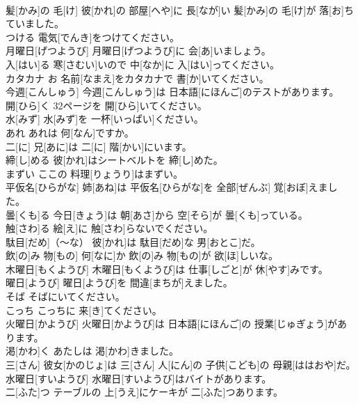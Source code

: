 \documentclass[8pt]{extreport}
\begin{document}
\begin{CJK}{UTF8}{min}
\\	髪[かみ]の 毛[け]	彼[かれ]の 部屋[へや]に 長[なが]い 髪[かみ]の 毛[け]が 落[お]ちていました。		
\\	つける	電気[でんき]をつけてください。		
\\	月曜日[げつようび]	月曜日[げつようび]に 会[あ]いましょう。		
\\	入[はい]る	寒[さむい]いので 中[なか]に 入[はい]ってください。		
\\	カタカナ	お 名前[なまえ]をカタカナで 書[か]いてください。		
\\	今週[こんしゅう]	今週[こんしゅう]は 日本語[にほんご]のテストがあります。		
\\	開[ひら]く	32ページを 開[ひら]いてください。		
\\	水[みず]	水[みず]を 一杯[いっぱい]ください。		
\\	あれ	あれは 何[なん]ですか。		
\\	二[に]	兄[あに]は 二[に] 階[かい]にいます。		
\\	締[し]める	彼[かれ]はシートベルトを 締[し]めた。		
\\	まずい	ここの 料理[りょうり]はまずい。		
\\	平仮名[ひらがな]	姉[あね]は 平仮名[ひらがな]を 全部[ぜんぶ] 覚[おぼ]えました。		
\\	曇[くも]る	今日[きょう]は 朝[あさ]から 空[そら]が 曇[くも]っている。		
\\	触[さわ]る	絵[え]に 触[さわ]らないでください。		
\\	駄目[だめ]（～な）	彼[かれ]は 駄目[だめ]な 男[おとこ]だ。		
\\	飲[の]み 物[もの]	何[なに]か 飲[の]み 物[もの]が 欲[ほ]しいな。		
\\	木曜日[もくようび]	木曜日[もくようび]は 仕事[しごと]が 休[やす]みです。		
\\	曜日[ようび]	曜日[ようび]を 間違[まちが]えました。		
\\	そば	そばにいてください。		
\\	こっち	こっちに 来[き]てください。		
\\	火曜日[かようび]	火曜日[かようび]は 日本語[にほんご]の 授業[じゅぎょう]があります。		
\\	渇[かわ]く	あたしは 渇[かわ]きました。		
\\	三[さん]	彼女[かのじょ]は 三[さん] 人[にん]の 子供[こども]の 母親[ははおや]だ。		
\\	水曜日[すいようび]	水曜日[すいようび]はバイトがあります。		
\\	二[ふた]つ	テーブルの 上[うえ]にケーキが 二[ふた]つあります。		

\end{CJK}
\end{document}
